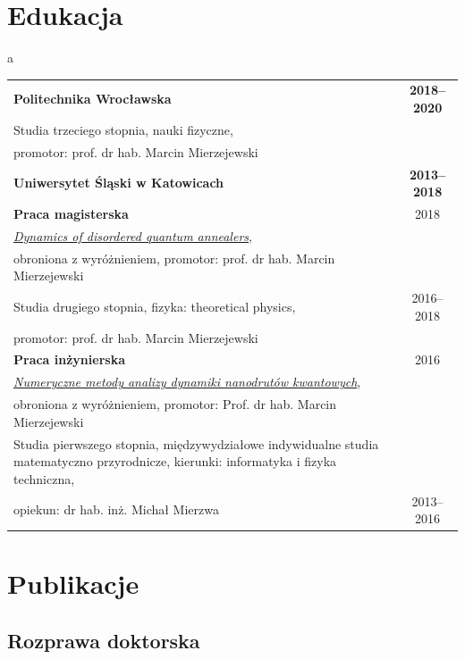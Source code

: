 \vspace{0.3cm}

\ornament

\section*{Edukacja}


\phantom a

\vspace{-2.1ex}

\noindent
\begin{tabular}{p{12cm}c}
\textbf{Politechnika Wrocławska} & \textbf{2018--2020} \\[1ex]
Studia trzeciego stopnia, nauki fizyczne,\\ promotor: prof. dr hab. Marcin Mierzejewski\\[3ex]
\textbf{Uniwersytet Śląski w Katowicach} & \textbf{2013--2018}\\[1ex]
\textbf{Praca magisterska} & 2018\\
\href{https://andywiecko.github.io/assets/msc_thesis.pdf}{\textit{Dynamics of disordered quantum annealers}},\\ obroniona z wyróżnieniem, promotor: prof. dr hab. Marcin Mierzejewski\\[1ex]
Studia drugiego stopnia, fizyka: theoretical physics, & 2016--2018 \\
promotor: prof. dr hab. Marcin Mierzejewski\\[1ex]
\textbf{Praca inżynierska} &  2016\\
\href{https://andywiecko.github.io/assets/beng_thesis.pdf}{\textit{Numeryczne metody analizy dynamiki nanodrutów kwantowych}},\\ obroniona z wyróżnieniem, promotor: Prof. dr hab. Marcin Mierzejewski\\[1ex]
Studia pierwszego stopnia,  międzywydziałowe indywidualne studia matematyczno przyrodnicze, kierunki: informatyka i fizyka techniczna,\\ opiekun: dr hab. inż. Michał Mierzwa  & 2013--2016 \\
\end{tabular}

\ornament

\newpage
 
\section*{Publikacje} 
\subsection*{Rozprawa doktorska}

